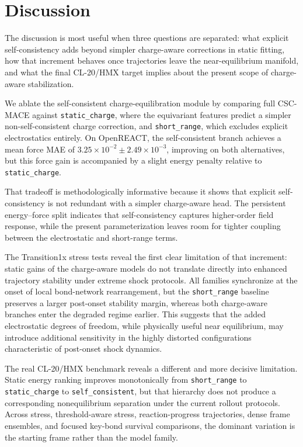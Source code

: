 \section{Discussion}
\label{sec:discussion}

The discussion is most useful when three questions are separated: what explicit self-consistency adds beyond simpler charge-aware corrections in static fitting, how that increment behaves once trajectories leave the near-equilibrium manifold, and what the final CL-20/HMX target implies about the present scope of charge-aware stabilization.

We ablate the self-consistent charge-equilibration module by comparing full CSC-MACE against \texttt{static\_charge}, where the equivariant features predict a simpler non-self-consistent charge correction, and \texttt{short\_range}, which excludes explicit electrostatics entirely. On OpenREACT, the self-consistent branch achieves a mean force MAE of $3.25 \times 10^{-2} \pm 2.49 \times 10^{-3}$, improving on both alternatives, but this force gain is accompanied by a slight energy penalty relative to \texttt{static\_charge}.

That tradeoff is methodologically informative because it shows that explicit self-consistency is not redundant with a simpler charge-aware head. The persistent energy--force split indicates that self-consistency captures higher-order field response, while the present parameterization leaves room for tighter coupling between the electrostatic and short-range terms.

The Transition1x stress tests reveal the first clear limitation of that increment: static gains of the charge-aware models do not translate directly into enhanced trajectory stability under extreme shock protocols. All families synchronize at the onset of local bond-network rearrangement, but the \texttt{short\_range} baseline preserves a larger post-onset stability margin, whereas both charge-aware branches enter the degraded regime earlier. This suggests that the added electrostatic degrees of freedom, while physically useful near equilibrium, may introduce additional sensitivity in the highly distorted configurations characteristic of post-onset shock dynamics.

The real CL-20/HMX benchmark reveals a different and more decisive limitation. Static energy ranking improves monotonically from \texttt{short\_range} to \texttt{static\_charge} to \texttt{self\_consistent}, but that hierarchy does not produce a corresponding nonequilibrium separation under the current rollout protocols. Across stress, threshold-aware stress, reaction-progress trajectories, dense frame ensembles, and focused key-bond survival comparisons, the dominant variation is the starting frame rather than the model family.

